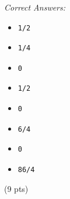 \documentclass[10pt,dvips]{amsart}
\begin{document}
\par{\small{\it Correct Answers:}
\vspace{-\parskip}\begin{itemize}
\item\begin{verbatim}1/2\end{verbatim}
\item\begin{verbatim}1/4\end{verbatim}
\item\begin{verbatim}0\end{verbatim}
\item\begin{verbatim}1/2\end{verbatim}
\item\begin{verbatim}0\end{verbatim}
\item\begin{verbatim}6/4\end{verbatim}
\item\begin{verbatim}0\end{verbatim}
\item\begin{verbatim}86/4\end{verbatim}
\end{itemize}}\par
% 
% 


 (9 pts) \ifdim\lastskip=\pgmlMarker
  \let\pgmlPar=\relax
 \else
  \let\pgmlPar=\par
  \vadjust{\kern3pt}%
\fi
\end{document}

